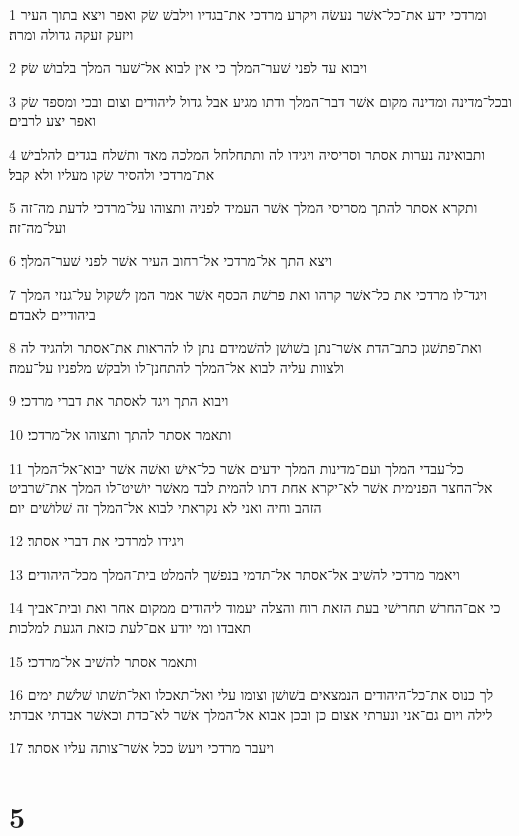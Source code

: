 \par 1 ומרדכי ידע את־כל־אשׁר נעשׂה ויקרע מרדכי את־בגדיו וילבשׁ שׂק ואפר ויצא בתוך העיר ויזעק זעקה גדולה ומרה׃
\par 2 ויבוא עד לפני שׁער־המלך כי אין לבוא אל־שׁער המלך בלבושׁ שׂק׃
\par 3 ובכל־מדינה ומדינה מקום אשׁר דבר־המלך ודתו מגיע אבל גדול ליהודים וצום ובכי ומספד שׂק ואפר יצע לרבים׃
\par 4 ותבואינה נערות אסתר וסריסיה ויגידו לה ותתחלחל המלכה מאד ותשׁלח בגדים להלבישׁ את־מרדכי ולהסיר שׂקו מעליו ולא קבל׃
\par 5 ותקרא אסתר להתך מסריסי המלך אשׁר העמיד לפניה ותצוהו על־מרדכי לדעת מה־זה ועל־מה־זה׃
\par 6 ויצא התך אל־מרדכי אל־רחוב העיר אשׁר לפני שׁער־המלך׃
\par 7 ויגד־לו מרדכי את כל־אשׁר קרהו ואת פרשׁת הכסף אשׁר אמר המן לשׁקול על־גנזי המלך ביהודיים לאבדם׃
\par 8 ואת־פתשׁגן כתב־הדת אשׁר־נתן בשׁושׁן להשׁמידם נתן לו להראות את־אסתר ולהגיד לה ולצוות עליה לבוא אל־המלך להתחנן־לו ולבקשׁ מלפניו על־עמה׃
\par 9 ויבוא התך ויגד לאסתר את דברי מרדכי׃
\par 10 ותאמר אסתר להתך ותצוהו אל־מרדכי׃
\par 11 כל־עבדי המלך ועם־מדינות המלך ידעים אשׁר כל־אישׁ ואשׁה אשׁר יבוא־אל־המלך אל־החצר הפנימית אשׁר לא־יקרא אחת דתו להמית לבד מאשׁר יושׁיט־לו המלך את־שׁרביט הזהב וחיה ואני לא נקראתי לבוא אל־המלך זה שׁלושׁים יום׃
\par 12 ויגידו למרדכי את דברי אסתר׃
\par 13 ויאמר מרדכי להשׁיב אל־אסתר אל־תדמי בנפשׁך להמלט בית־המלך מכל־היהודים׃
\par 14 כי אם־החרשׁ תחרישׁי בעת הזאת רוח והצלה יעמוד ליהודים ממקום אחר ואת ובית־אביך תאבדו ומי יודע אם־לעת כזאת הגעת למלכות׃
\par 15 ותאמר אסתר להשׁיב אל־מרדכי׃
\par 16 לך כנוס את־כל־היהודים הנמצאים בשׁושׁן וצומו עלי ואל־תאכלו ואל־תשׁתו שׁלשׁת ימים לילה ויום גם־אני ונערתי אצום כן ובכן אבוא אל־המלך אשׁר לא־כדת וכאשׁר אבדתי אבדתי׃
\par 17 ויעבר מרדכי ויעשׂ ככל אשׁר־צותה עליו אסתר׃

\chapter{5}

